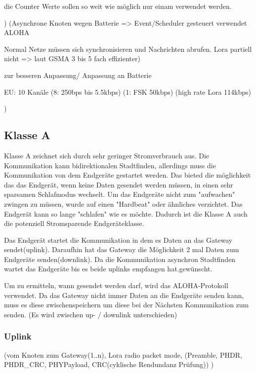 \documentclass[a4paper,12pt]{article}
\begin{document}
        die Counter Werte sollen so weit wie möglich nur einam verwendet werden.
        
        )
        \cite{LoraClasses}
        \cite{WhatIsLoRa}(Asynchrone Knoten wegen Batterie => Event/Scheduler gesteuert verwendet ALOHA
        
        Normal Netze müssen sich synchronisieren und Nachrichten abrufen. Lora partiell nicht => laut GSMA 3 bis 5 fach effizienter)
    
        zur besseren Anpassung/ Anpassung an Batterie
        
        EU: 10 Kanäle (8: 250bps bis 5.5kbps) (1: FSK 50kbps) (high rate Lora 114kbps)

        )
        \subsection{Klasse A}\label{sec:ClassA}
            Klasse A zeichnet sich durch sehr geringer Stromverbrauch aus. Die Kommunikation kann bidirektionalen Stadtfinden, allerdings muss die Kommunikation von dem Endgeräte gestartet werden. Das bieted die möglichkeit das das Endgerät, wenn keine Daten gesendet werden müssen, in einen sehr
            sparsamen Schlafmodus wechselt. Um das Endgeräte nicht zum "aufwachen" zwingen zu müssen, wurde auf einen "Hardbeat" oder ähnliches verzichtet. Das Endgerät kann so lange "schlafen" wie es möchte. Dadurch ist die Klasse A auch die potenziell Stromsparende Endgeräteklasse.
            
            Das Endgerät startet die Kommunikation in dem es Daten an das Gateway sendet(uplink). Daraufhin hat das Gateway die Möglichkeit 2 mal Daten zum Endgeräte senden(downlink). Da die Kommunikation asynchron Stadtfinden wartet das Endgeräte bis es beide uplinks empfangen hat.gewünscht.
            
            Um zu ermitteln, wann gesendet werden darf, wird das ALOHA-Protokoll verwendet.
            Da das Gateway nicht immer Daten an die Endgeräte senden kann, muss es diese zwischenspeichern um diese bei der Nächsten Kommunikation zum senden.
            \cite{LoRaSpec}(Es wird zwischen up- / downlink unterschieden)

            \subsubsection{Uplink}

                \cite{LoRaSpec} 
                    (vom Knoten zum Gateway(1..n), Lora radio packet mode, (Preamble, PHDR, PHDR\_CRC, PHYPayload, CRC(cyklische Rendundanz Prüfung))
                 )
\end{document}
